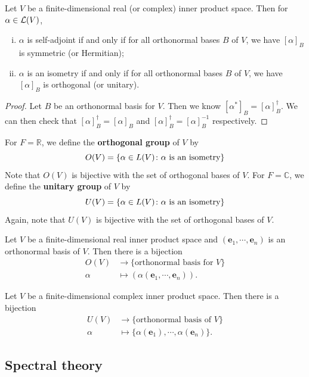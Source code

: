 \documentclass[a4paper]{article}
\begin{document}
\begin{lemma}
	Let \( V \) be a finite-dimensional real (or complex) inner product space.
	Then for \( \alpha \in {\mathcal{L}}(V) \),
	\begin{enumerate}[(i)]
		\item \( \alpha \) is self-adjoint if and only if for all orthonormal bases \( B \) of \( V \), we have \( [\alpha]_B \) is symmetric (or Hermitian);
		\item \( \alpha \) is an isometry if and only if for all orthonormal bases \( B \) of \( V \), we have \( [\alpha]_B \) is orthogonal (or unitary).
	\end{enumerate}
\end{lemma}
\begin{proof}
	Let \( B \) be an orthonormal basis for \( V \).
	Then we know \( [\alpha^*]_B = [\alpha]_B^\dagger \).
	We can then check that \( [\alpha]_B^\dagger = [\alpha]_B \) and \( [\alpha]_B^\dagger = [\alpha]_B^{-1} \) respectively.
\end{proof}
\begin{definition}
	For \( F = \mathbb R \), we define the \textbf{orthogonal group} of \( V \) by
	\[
		O(V) = \qty{ \alpha \in L(V) \colon \alpha \text{ is an isometry} }
	\]
	Note that \( O(V) \) is bijective with the set of orthogonal bases of \( V \).
	For \( F = \mathbb C \), we define the \textbf{unitary group} of \( V \) by
	\[
		U(V) = \qty{ \alpha \in L(V) \colon \alpha \text{ is an isometry} }
	\]
	Again, note that \( U(V) \) is bijective with the set of orthogonal bases of \( V \).
\end{definition}

Let $V$ be a finite-dimensional real inner product space and $(\mathbf{e}_1, \cdots, \mathbf{e}_n)$ is an orthonormal basis of $V$. Then there is a bijection
\begin{align*}
O(V) &\to \{\text{orthonormal basis for }V\}\\
\alpha &\mapsto (\alpha(\mathbf{e}_1, \cdots, \mathbf{e}_n)).
\end{align*}

Let $V$ be a finite-dimensional complex inner product space. Then there is a bijection
\begin{align*}
U(V) &\to \{\text{orthonormal basis of } V\}\\
\alpha &\mapsto \{\alpha(\mathbf{e}_1), \cdots, \alpha (\mathbf{e}_n)\}.
\end{align*}

\subsection{Spectral theory}
\end{document}
